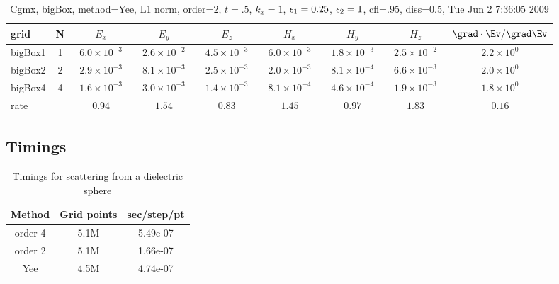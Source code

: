 \begin{table}[hbt]\tableFont %
\begin{center}
\begin{tabular}{|l|c|c|c|c|c|c|c|c|} \hline 
grid  & N &  $E_x$ &  $E_y$ & $E_z$ &  $H_x$ &  $H_y$ & $H_z$ & $\grad\cdot\Ev/\grad\Ev$\\ \hline 
             bigBox1 &     1 & ~$6.0\times10^{ -3}$~ & ~$2.6\times10^{ -2}$~ & ~$4.5\times10^{ -3}$~ & ~$6.0\times10^{ -3}$~ & ~$1.8\times10^{ -3}$~ & ~$2.5\times10^{ -2}$~ & ~$2.2\times10^{  0}$~  \\ \hline
             bigBox2 &     2 & ~$2.9\times10^{ -3}$~ & ~$8.1\times10^{ -3}$~ & ~$2.5\times10^{ -3}$~ & ~$2.0\times10^{ -3}$~ & ~$8.1\times10^{ -4}$~ & ~$6.6\times10^{ -3}$~ & ~$2.0\times10^{  0}$~  \\ \hline
             bigBox4 &     4 & ~$1.6\times10^{ -3}$~ & ~$3.0\times10^{ -3}$~ & ~$1.4\times10^{ -3}$~ & ~$8.1\times10^{ -4}$~ & ~$4.6\times10^{ -4}$~ & ~$1.9\times10^{ -3}$~ & ~$1.8\times10^{  0}$~  \\ \hline
    rate             &       &       $0.94$          &       $1.54$          &       $0.83$          &       $1.45$          &       $0.97$          &       $1.83$          &       $0.16$           \\ \hline
\end{tabular}
\caption{Cgmx, bigBox, method=Yee, L1 norm, order=$2$, $t=.5$, $k_x=1$, $\epsilon_1=0.25$, $\epsilon_2=1$, cfl=$.95$, diss=$0.5$, Tue Jun  2  7:36:05 2009}\label{table:dielectricSphereYeeOrder2L1}
\end{center}
\end{table}

\subsection{Timings}


\begin{table}[hbt]\tableFont %
\begin{center}
\begin{tabular}{|c|c|c|} \hline 
Method  & Grid points &  sec/step/pt \\ \hline 
order 4 &   5.1M      & 5.49e-07  \\
order 2 &   5.1M      & 1.66e-07  \\
Yee     &   4.5M      & 4.74e-07  \\\hline 
\end{tabular}
\caption{Timings for scattering from a dielectric sphere}\label{table:dielectricSphereTimings}
\end{center}
\end{table}

